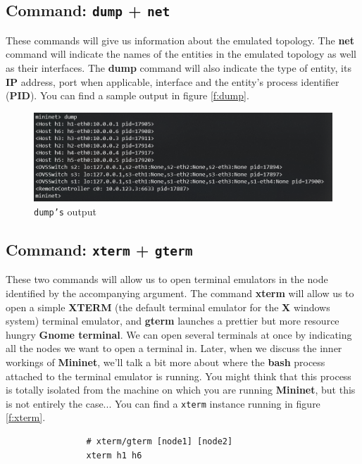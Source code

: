 \documentclass[12pt]{report}
\begin{document}
\begin{itemize}
{{{{		\subsection{Command: \texttt{dump} + \texttt{net}}
			These commands will give us information about the emulated topology. The \textbf{net} command will indicate the names of the entities in the emulated topology as well as their interfaces. The \textbf{dump} command will also indicate the type of entity, its \textbf{IP} address, port when applicable, interface and the entity's process identifier (\textbf{PID}). You can find a sample output in figure \ref{f:dump}.

			\begin{figure}
				\centering
				\includegraphics[scale = 1]{dump.png}
				\caption{\texttt{dump's} output}
				\label{f:fump}
			\end{figure}

		\subsection{Command: \texttt{xterm} + \texttt{gterm}}
			These two commands will allow us to open terminal emulators in the node identified by the accompanying argument. The command \textbf{xterm} will allow us to open a simple \textbf{XTERM} (the default terminal emulator for the \textbf{X} windows system) terminal emulator, and \textbf{gterm} launches a prettier but more resource hungry \textbf{Gnome terminal}. We can open several terminals at once by indicating all the nodes we want to open a terminal in. Later, when we discuss the inner workings of \textbf{Mininet}, we'll talk a bit more about where the \textbf{bash} process attached to the terminal emulator is running. You might think that this process is totally isolated from the machine on which you are running \textbf{Mininet}, but this is not entirely the case... You can find a \texttt{xterm} instance running in figure \ref{f:xterm}.

			\begin{verbatim}
				# xterm/gterm [node1] [node2]
				xterm h1 h6
			\end{verbatim}

}}}}
\end{itemize}
\end{document}
